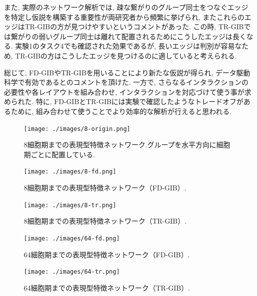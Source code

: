 \documentclass{kuee}
\begin{document}
また, 実際のネットワーク解析では, 疎な繋がりのグループ同士をつなぐエッジを特定し仮説を構築する重要性が両研究者から頻繁に挙げられ, またこれらのエッジはTR-GIBの方が見つけやすいというコメントがあった.
この時, TR-GIBでは繋がりの弱いグループ同士は離れて配置されるためにこうしたエッジは長くなる.
実験1のタスク4でも確認された効果であるが, 長いエッジは判別が容易なため, TR-GIBの方はこうしたエッジを見つけるのに適していると考えられる.

総じて, FD-GIBやTR-GIBを用いることにより新たな仮説が得られ, データ駆動科学で有効であるとのコメントを頂けた.
一方で, さらなるインタラクションの必要性や各レイアウトを組み合わせ, インタラクションを対応づけて使う事が求められた.
特に, FD-GIBとTR-GIBには実験で確認したようなトレードオフがあるために, 組み合わせて使うことでより効率的な解析が行えると思われる.

\begin{figure}[t]
  \begin{center}
  \texttt{[image: ./images/8-origin.png]}
  \caption{8細胞期までの表現型特徴ネットワーク.グループを水平方向に細胞期ごとに配置している. \label{fig:8-origin}}
  \end{center}
\end{figure}

\begin{figure}[t]
  \begin{center}
  \texttt{[image: ./images/8-fd.png]}
  \caption{8細胞期までの表現型特徴ネットワーク（FD-GIB）. \label{fig:8-fd}}
  \end{center}
\end{figure}

\begin{figure}[t]
  \begin{center}
  \texttt{[image: ./images/8-tr.png]}
  \caption{8細胞期までの表現型特徴ネットワーク（TR-GIB）. \label{fig:8-tr}}
  \end{center}
\end{figure}

\begin{figure}[t]
  \begin{center}
  \texttt{[image: ./images/64-fd.png]}
  \caption{64細胞期までの表現型特徴ネットワーク（FD-GIB）. \label{fig:64-fd}}
  \end{center}
\end{figure}

\begin{figure}[t]
  \begin{center}
  \texttt{[image: ./images/64-tr.png]}
  \caption{64細胞期までの表現型特徴ネットワーク（TR-GIB）. \label{fig:64-tr}}
  \end{center}
\end{figure}
\end{document}
